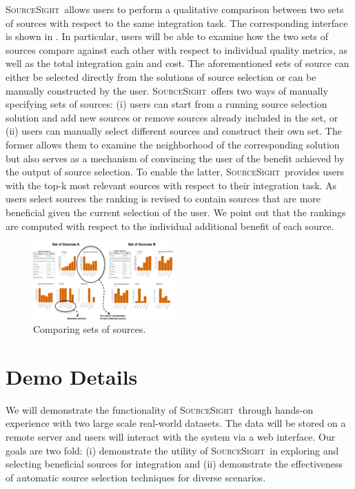 \documentclass{vldb}
\newcommand\system{\textsc{SourceSight}}
\begin{document}
\system~allows users to perform a qualitative comparison between two sets of sources with respect to the same integration task. The corresponding interface is shown in . In particular, users will be able to examine how the two sets of sources compare against each other with respect to individual quality metrics, as well as the total integration gain and cost. The aforementioned sets of source can either be selected directly from the solutions of source selection or can be manually constructed by the user. \system~offers two ways of manually specifying sets of sources: (i) users can start from a running source selection solution and add new sources or remove sources already included in the set, or (ii) users can manually select different sources and construct their own set. The former allows them to examine the neighborhood of the corresponding solution but also serves as a mechanism of convincing the user of the benefit achieved by the output of source selection. To enable the latter, \system~provides users with the top-k most relevant sources with respect to their integration task. As users select sources the ranking is revised to contain sources that are more beneficial given the current selection of the user. We point out that the rankings are computed with respect to the individual additional benefit of each source. 
\begin{figure}
	\begin{center}
	\includegraphics[trim=0 0 0 0, clip,width=0.48\textwidth]{fig/compSS}
	\caption{Comparing sets of sources.}
	\label{fig:comparison}
	\end{center}
\end{figure}

\section{Demo Details}
\label{sec:details}
We will demonstrate the functionality of \system~through hands-on experience with two large scale real-world datasets. The data will be stored on a remote server and users will interact with the system via a web interface. Our goals are two fold: (i) demonstrate the utility of \system~in exploring and selecting beneficial sources for integration and (ii) demonstrate the effectiveness of automatic source selection techniques for diverse scenarios. 
\end{document}
